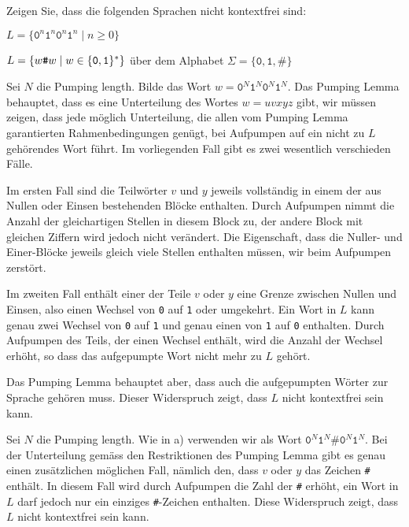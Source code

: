 Zeigen Sie, dass die folgenden Sprachen nicht kontextfrei sind:
\begin{teilaufgaben}
\item $L=\{\texttt{0}^n\texttt{1}^n\texttt{0}^n\texttt{1}^n\mid n\ge 0\}$
\item $L=\{w{\texttt{\#}}w\mid w\in\{{\tt 0},{\tt 1}\}^*\}$ über dem Alphabet
$\Sigma=\{\texttt{0},\texttt{1},\texttt{\#}\}$
\end{teilaufgaben}


\begin{loesung}
\begin{teilaufgaben}
\item Sei $N$ die Pumping length.
Bilde das Wort $w=\texttt{0}^N\texttt{1}^N\texttt{0}^N\texttt{1}^N$.
Das Pumping Lemma
behauptet, dass es eine Unterteilung des Wortes $w=uvxyz$ gibt, wir
müssen zeigen, dass jede möglich Unterteilung, die allen vom
Pumping Lemma garantierten Rahmenbedingungen genügt, bei Aufpumpen
auf ein nicht zu $L$ gehörendes Wort führt.
Im vorliegenden Fall
gibt es zwei wesentlich verschieden Fälle.

Im ersten Fall sind die
Teilwörter $v$ und $y$ jeweils vollständig in einem der aus Nullen
oder Einsen bestehenden Blöcke enthalten. Durch Aufpumpen nimmt die
Anzahl der gleichartigen Stellen in diesem Block zu, der andere Block
mit gleichen Ziffern wird jedoch nicht verändert.
Die Eigenschaft, dass die Nuller- und
Einer-Blöcke jeweils gleich viele Stellen enthalten müssen, wir
beim Aufpumpen zerstört.

Im zweiten Fall enthält einer der Teile $v$ oder $y$ eine
Grenze zwischen Nullen und Einsen, also einen Wechsel von
\texttt{0} auf \texttt{1} oder umgekehrt.
Ein Wort in $L$ kann
genau zwei Wechsel von \texttt{0} auf \texttt{1} und genau einen
von \texttt{1} auf \texttt{0} enthalten.
Durch Aufpumpen des Teils,
der einen Wechsel enthält, wird die Anzahl der Wechsel erhöht,
so dass das aufgepumpte Wort nicht mehr zu $L$ gehört.

Das Pumping Lemma behauptet aber, dass auch die aufgepumpten Wörter
zur Sprache gehören muss. Dieser Widerspruch zeigt, dass $L$
nicht kontextfrei sein kann.
\item Sei $N$ die Pumping length. Wie in a) verwenden wir als
Wort $\texttt{0}^N\texttt{1}^N\texttt{\#}\texttt{0}^N\texttt{1}^N$.
Bei der Unterteilung
gemäss den Restriktionen des Pumping Lemma gibt es genau einen zusätzlichen
möglichen Fall, nämlich den, dass $v$ oder $y$ das Zeichen {\tt\#}
enthält.
In diesem Fall wird durch Aufpumpen die Zahl der {\tt\#}
erhöht, ein Wort in $L$ darf jedoch nur ein einziges {\tt\#}-Zeichen
enthalten.
Diese Widerspruch zeigt, dass $L$ nicht kontextfrei sein kann.
\qedhere
\end{teilaufgaben}
\end{loesung}

